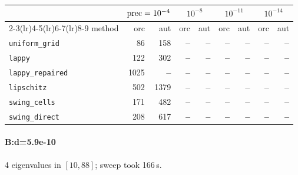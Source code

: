 \begin{center}
\small
\begin{tabular}{lrrrrrrrr}
\toprule
& \multicolumn{2}{c}{$\mathrm{prec}=10^{-4}$} & \multicolumn{2}{c}{$10^{-8}$} & \multicolumn{2}{c}{$10^{-11}$} & \multicolumn{2}{c}{$10^{-14}$} \\
\cmidrule(lr){2-3}\cmidrule(lr){4-5}\cmidrule(lr){6-7}\cmidrule(lr){8-9}
method & orc & aut & orc & aut & orc & aut & orc & aut \\
\midrule
\texttt{uniform\_grid} & 86 & 158 & \textbf{--} & \textbf{--} & \textbf{--} & \textbf{--} & \textbf{--} & \textbf{--} \\
\texttt{lappy} & 122 & 302 & \textbf{--} & \textbf{--} & \textbf{--} & \textbf{--} & \textbf{--} & \textbf{--} \\
\texttt{lappy\_repaired} & 1025 & \textbf{--} & \textbf{--} & \textbf{--} & \textbf{--} & \textbf{--} & \textbf{--} & \textbf{--} \\
\texttt{lipschitz} & 502 & 1379 & \textbf{--} & \textbf{--} & \textbf{--} & \textbf{--} & \textbf{--} & \textbf{--} \\
\texttt{swing\_cells} & 171 & 482 & \textbf{--} & \textbf{--} & \textbf{--} & \textbf{--} & \textbf{--} & \textbf{--} \\
\texttt{swing\_direct} & 208 & 617 & \textbf{--} & \textbf{--} & \textbf{--} & \textbf{--} & \textbf{--} & \textbf{--} \\
\bottomrule
\end{tabular}
\end{center}

\paragraph{B:d=5.9e-10} 4 eigenvalues in $[10, 88]$; sweep took 166\,s.

